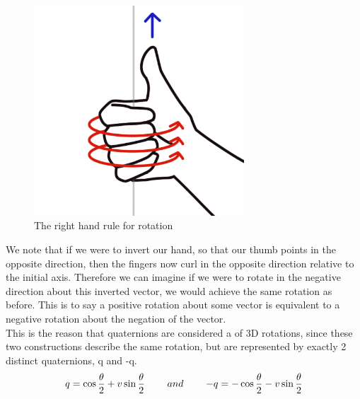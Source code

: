 \begin{figure}[h]
    \centering
    \includegraphics[width=0.7\textwidth]{figures/right-hand-rule.png}
    \caption{The right hand rule for rotation}
    \label{fig:right-hand-rule}
\end{figure}

We note that if we were to invert our hand, so that our thumb points in the opposite direction, then the fingers now curl in the opposite direction relative to the initial axis. Therefore we can imagine if we were to rotate in the negative direction about this inverted vector, we would achieve the same rotation as before. This is to say a positive rotation about some vector is equivalent to a negative rotation about the negation of the vector.\\
This is the reason that quaternions are considered a  of 3D rotations, since these two constructions describe the same rotation, but are represented by exactly 2 distinct quaternions, q and -q.
$$ q = \cos{\frac{\theta}{2}} + v\sin{\frac{\theta}{2}} \operatorname{\operatorname{\: \: \: \:} \operatorname{\: \: \: \:}} and \operatorname{\operatorname{\: \: \: \:} \operatorname{\: \: \: \:}} -q = -\cos{\frac{\theta}{2}} - v\sin{\frac{\theta}{2}}$$






